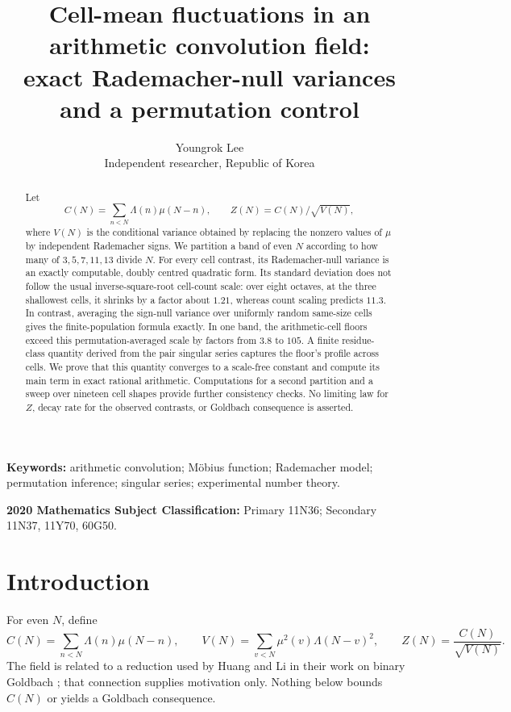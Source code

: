 \documentclass[11pt,a4paper]{article}
\title{Cell-mean fluctuations in an arithmetic convolution field:\\
exact Rademacher-null variances and a permutation control}
\author{Youngrok Lee\\
\small Independent researcher, Republic of Korea}
\date{}
\theoremstyle{plain}
\theoremstyle{definition}
\theoremstyle{remark}
\begin{document}
\maketitle

\begin{abstract}
Let
\[
 C(N)=\sum_{n<N}\Lambda(n)\mu(N-n),\qquad
 Z(N)=C(N)/\sqrt{V(N)},
\]
where $V(N)$ is the conditional variance obtained by replacing the
nonzero values of $\mu$ by independent Rademacher signs.  We partition
a band of even $N$ according to how many of $3,5,7,11,13$ divide $N$.
For every cell contrast, its Rademacher-null variance is an exactly
computable, doubly centred quadratic form.  Its standard deviation does
not follow the usual inverse-square-root cell-count scale: over eight
octaves, at the three shallowest cells, it shrinks by a factor about
$1.21$, whereas count scaling predicts $11.3$.  In contrast, averaging
the sign-null variance over uniformly random same-size cells gives the
finite-population formula exactly.  In one band, the arithmetic-cell
floors exceed this permutation-averaged scale by factors from $3.8$ to
$105$.  A finite residue-class quantity derived from the pair singular
series captures the floor's profile across cells.  We prove that this
quantity converges to a scale-free constant and compute its main term in
exact rational arithmetic.  Computations for a second partition and a
sweep over nineteen cell shapes provide further consistency checks.  No
limiting law for $Z$, decay rate for the observed contrasts, or Goldbach
consequence is asserted.
\end{abstract}

\medskip
\noindent\textbf{Keywords:}
arithmetic convolution; M\"obius function; Rademacher model;
permutation inference; singular series; experimental number theory.

\medskip
\noindent\textbf{2020 Mathematics Subject Classification:}
Primary 11N36; Secondary 11N37, 11Y70, 60G50.

\section{Introduction}

For even $N$, define
\begin{equation}\label{eq:field}
 C(N)=\sum_{n<N}\Lambda(n)\mu(N-n),\qquad
 V(N)=\sum_{v<N}\mu^2(v)\Lambda(N-v)^2,
 \qquad Z(N)=\frac{C(N)}{\sqrt{V(N)}}.
\end{equation}
The field is related to a reduction used by Huang and Li in their work
on binary Goldbach \cite[Thm.~1, Cor.~1]{HL}; that connection supplies
motivation only.  Nothing below bounds $C(N)$ or yields a Goldbach
consequence.
\end{document}
